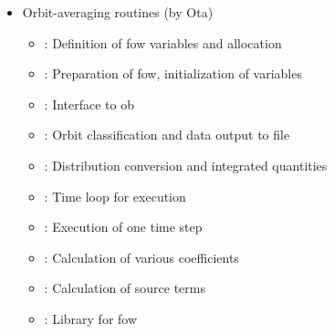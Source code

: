 \documentclass[11pt]{article}
\begin{document}
\begin{itemize}
\item
  Orbit-averaging routines (by Ota)
  \begin{itemize}
  \item[] : Definition of fow variables and
    allocation 
  \item[] : Preparation of fow, initialization of variables
  \item[] : Interface to ob
  \item[] : Orbit classification and data output to file
  \item[] : Distribution conversion and
    integrated quantities
  \item[] : Time loop for execution
  \item[] : Execution of one time step
  \item[] : Calculation of various coefficients
  \item[] : Calculation of source terms
  \item[] : Library for fow
  \end{itemize}
\end{itemize}
\end{document}
